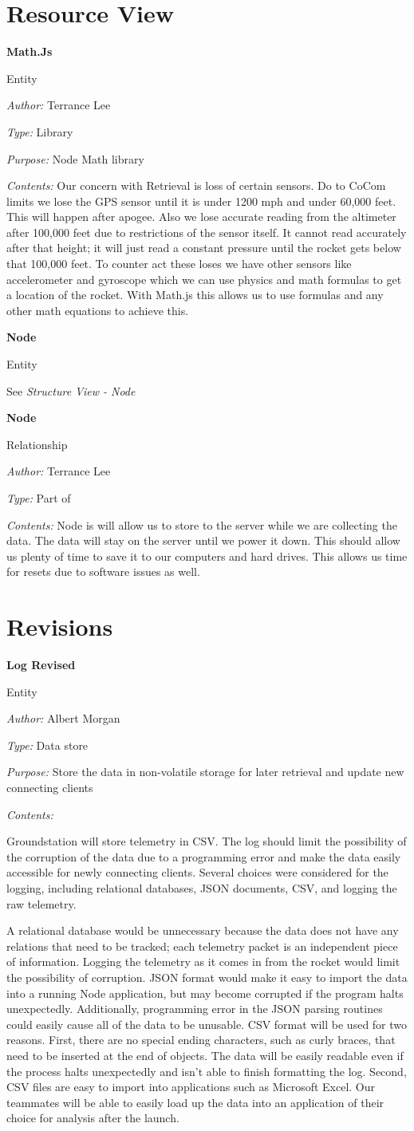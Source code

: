 \documentclass[10pt,draftclsnofoot,onecolumn]{IEEEtran}
\newcommand{\newentity}[5]{

	\noindent\textbf{#2}
	
	\noindent Entity
	
	\noindent\textit{Author:} {#1}
		
	\noindent\textit{Type:} {#3}
	
	\noindent\textit{Purpose:} {#4}

	\noindent\textit{Contents:} {#5}
	\vspace{.5cm}

}
\newcommand{\newrelationship}[4]{
	\noindent\textbf{#2}
	
	\noindent Relationship
	
	\noindent\textit{Author:} #1

	\noindent\textit{Type:} #3

	\noindent\textit{Contents:} #4

	\vspace{.5cm}
}
\newcommand{\entityref}[2]{

	\noindent\textbf{#1}
	
	\noindent Entity
	
	\noindent See \textit{#2}

	\vspace{.5cm}
}
\begin{document}
	\section{Resource View}
    
     
   \newentity
	{Terrance Lee}
	{Math.Js}
	{Library}
	{Node Math library}
	{Our concern with Retrieval is loss of certain sensors.  Do to CoCom limits we lose the GPS sensor until it is under 1200 mph and under 60,000 feet. This will happen after apogee.  Also we lose accurate reading from the altimeter after 100,000 feet due to restrictions of the sensor itself.  It cannot read accurately after that height; it will just read a constant pressure until the rocket gets below that 100,000 feet. To counter act these loses we have other sensors like accelerometer and gyroscope which we can use physics and math formulas to get a location of the rocket.  With Math.js this allows us to use formulas and any other math equations to achieve this. }
     \entityref{Node}
	{Structure View - Node}
    
    \newrelationship
	{Terrance Lee}
	{Node}
	{Part of}
	{	Node is will allow us to store to the server while we are collecting the data. The data will stay on the server until we power it down.  This should allow us plenty of time to save it to our computers and hard drives.  This allows us time for resets due to software issues as well.  
		}
	
	
	\section{Revisions}


	\newentity
	{Albert Morgan}
	{Log Revised}
	{Data store}
	{Store the data in non-volatile storage for later retrieval and update new connecting clients}
	{
		Groundstation will store telemetry in CSV.
		The log should limit the possibility of the corruption of the data due to a programming error
		and make the data easily accessible for newly connecting clients.
		Several choices were considered for the logging, including relational databases, JSON documents, CSV, and logging the raw telemetry.
		
		A relational database would be unnecessary because the data does not have any relations that need to be tracked;
		each telemetry packet is an independent piece of information.
		Logging the telemetry as it comes in from the rocket would limit the possibility of corruption.
		JSON format would make it easy to import the data into a running Node application, but may become corrupted if the program halts
		unexpectedly.
		Additionally, programming error in the JSON parsing routines could easily cause all of the data to be unusable.
		CSV format will be used for two reasons.
		First, there are no special ending characters, such as curly braces, that need to be inserted at the end of objects.
		The data will be easily readable even if the process halts unexpectedly and isn't able to finish formatting the log.
		Second, CSV files are easy to import into applications such as Microsoft Excel.
		Our teammates will be able to easily load up the data into an application of their choice for analysis after the launch.

	}
\end{document}
